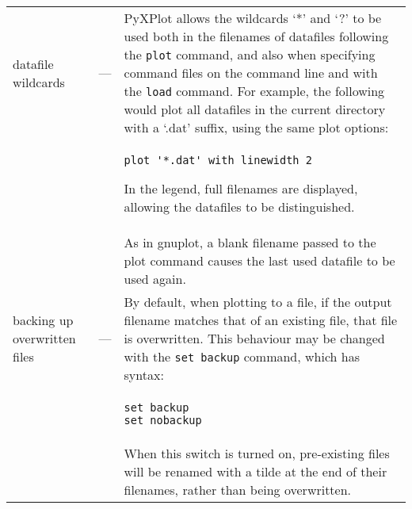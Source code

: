 \begin{longtable}{p{3cm}lp{9cm}}



datafile wildcards\index{globbing}\index{wildcards}\index{datafiles!globbing} & --- & PyXPlot allows the wildcards `*' and `?' to be used both in the filenames of datafiles following the \texttt{plot} command, and also when specifying command files on the command line and with the \texttt{load} command. For example, the following would plot all datafiles in the current directory with a `.dat' suffix, using the same plot options:
\\ & &
\begin{verbatim}
plot '*.dat' with linewidth 2
\end{verbatim}

In the legend, full filenames are displayed, allowing the datafiles to be distinguished.
\\ & &
As in gnuplot, a blank filename passed to the plot command causes the last used datafile to be used again.
\\

backing up overwritten files\index{set backup command@\texttt{set backup}
command}\index{overwriting files}\index{backup files}\label{filebackup} & ---
& By default, when plotting to a file, if the output filename matches that of
an existing file, that file is overwritten. This behaviour may be changed with
the \texttt{set backup} command, which has syntax:
\\ & &
\begin{verbatim}
set backup
set nobackup
\end{verbatim}
\\ & &
When this switch is turned on, pre-existing files will be renamed with a tilde at the end of their filenames, rather than being overwritten. \\

\end{longtable}
